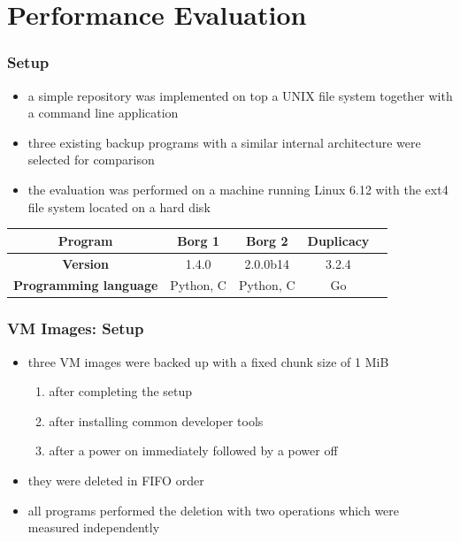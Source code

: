 \documentclass[english,utf8,aspectratio=169]{beamer}
\begin{document}
    \section{Performance Evaluation}
    \begin{frame}
        \frametitle{Setup}
        \begin{itemize}
            \item a simple repository was implemented on top a UNIX file system
                together with a command line application
            \item three existing backup programs with a similar internal architecture
                were selected for comparison 
            \item the evaluation was performed on a machine running Linux 6.12
                with the ext4 file system located on a hard disk
        \end{itemize}
        \begin{center}
            \begin{tabular}{ c c c c c }
                \toprule
                \textbf{Program} & Borg 1 & Borg 2 & Duplicacy \\
                \midrule
                \textbf{Version} & 1.4.0  & 2.0.0b14 & 3.2.4 \\
                \midrule
                \textbf{Programming language} & Python, C & Python, C & Go \\
                \bottomrule
            \end{tabular}
        \end{center}
    \end{frame}

    \begin{frame}
        \frametitle{VM Images: Setup}
        \begin{itemize}
            \item three VM images were backed up with a fixed chunk size of 1 MiB
            \begin{enumerate}
                \item after completing the setup
                \item after installing common developer tools
                \item after a power on immediately followed by a power off
            \end{enumerate}
            \item they were deleted in FIFO order
            \item all programs performed the deletion with two operations which were measured independently
        \end{itemize}
    \end{frame}
\end{document}
